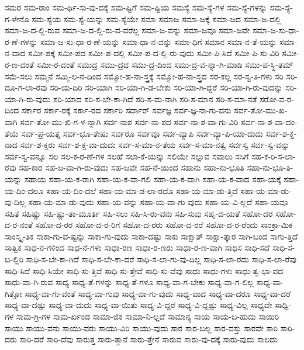 {ಸಮರ
ಸಮ-ರಾಂ
ಸಮ-ರ್ಥಿ-ಸು-ವು-ದಕ್ಕೆ
ಸಮ-ಷ್ಟಿಗೆ
ಸಮ-ಷ್ಟಿಯ
ಸಮಸ್ಯೆ
ಸಮ-ಸ್ಯೆ-ಗಳ
ಸಮ-ಸ್ಯೆ-ಗಳನ್ನು
ಸಮ-ಸ್ಯೆ-ಗ-ಳೇನೊ
ಸಮ-ಸ್ಯೆಯ
ಸಮ-ಸ್ಯೆ-ಯನ್ನು
ಸಮ-ಸ್ಯೆಯೇ
ಸಮಾ
ಸಮಾಜ
ಸಮಾ-ಜಕ್ಕೆ
ಸಮಾ-ಜದ
ಸಮಾ-ಜ-ದಲ್ಲಿ
ಸಮಾ-ಜ-ದ-ಲ್ಲಿ-ರುವ
ಸಮಾ-ಜ-ದ-ಲ್ಲಿ-ರು-ವ-ವರೆಲ್ಲ
ಸಮಾ-ಜ-ವನ್ನು
ಸಮಾ-ಜವೂ
ಸಮಾ-ಜವೇ
ಸಮಾ-ಜ-ಸು-ಧಾ-ರ-ಣೆ-ಗಳನ್ನು
ಸಮಾ-ಜ-ಸು-ಧಾ-ರ-ಣೆ-ಯನ್ನು
ಸಮಾ-ಧಾ-ನ-ವನ್ನು
ಸಮಾ-ಧಿಗೆ
ಸಮಾನ
ಸಮಾ-ನ-ತೆ-ಯನ್ನು
ಸಮಾ-ನ-ವಾದ
ಸಮೀ-ಪಕ್ಕೆ
ಸಮೀ-ಪದ
ಸಮೀ-ಪ-ದಲ್ಲಿ
ಸಮೀ-ಪ-ದ-ಲ್ಲಿ-ರು-ವುದು
ಸಮೀ-ಪಿ-ಸಿದೆ
ಸಮೀ-ಪಿ-ಸು-ವಿರಿ
ಸಮೀ-ರ-ಣ-ದಂತೆ
ಸಮೀ-ರ-ದಂತೆ
ಸಮುದ್ರ
ಸಮು-ದ್ರದ
ಸಮು-ದ್ರ-ದಿಂದ
ಸಮು-ದ್ರ-ವ-ನ್ನಾ-ಗಿ-ಮಾಡಿ
ಸಮು-ಪ-ಸ್ಥಿ-ತಮ್
ಸಮೆ-ಸಲು
ಸಮ್ಮನೆ
ಸಮ್ಮಿ-ಲ-ನ-ದಿಂದ
ಸಮ್ಮೋ-ಹ-ನಾ-ಸ್ತ್ರಕ್ಕೆ
ಸಮ್ಮೋ-ಹ-ನಾ-ಸ್ತ್ರದ
ಸರ-ಕಲ್ಲ
ಸರ-ಸ್ವ-ತಿ-ಗಳು
ಸರಿ
ಸರಿ-ದೂ-ಗ-ಲಾ-ರವು
ಸರಿ-ಯ-ದಿರಿ
ಸರಿ-ಯಾಗಿ
ಸರಿ-ಯಾ-ಗಿ-ಡ-ಬೇಕು
ಸರಿ-ಯಾ-ಗಿ-ದ್ದರೆ
ಸರಿ-ಯಾ-ಗಿ-ರು-ವುದನ್ನು
ಸರಿ-ಯಾ-ಗಿ-ರು-ವುದು
ಸರಿ-ಯಾದ
ಸರಿ-ಸ-ಬೇ-ಕಾ-ಗಿದೆ
ಸರಿ-ಸ-ಮ-ನಾಗಿ
ಸರಿ-ಸ-ಮಾನ
ಸರಿ-ಸ-ಮಾ-ನತೆ
ಸರೋ-ವ-ರ-ದಿಂದ
ಸರ್ಕಾರ
ಸರ್ಕಾ-ರಕ್ಕೆ
ಸರ್ಕಾ-ರದ
ಸರ್ಕಾರಿ
ಸರ್ದಾರ್
ಸರ್ವಜ್ಞ
ಸರ್ವ-ಜ್ಞ-ನಾ-ಗು-ವನು
ಸರ್ವ-ತೋ-ಮು-ಖ-ವಾಗಿ
ಸರ್ವ-ತೋ-ಮು-ಖಿ-ಗ-ಳ-ನ್ನಾಗಿ
ಸರ್ವ-ನಾಶ
ಸರ್ವ-ನಾ-ಶದ
ಸರ್ವ-ನಾ-ಶ-ವಾ-ಗು-ವಿರಿ
ಸರ್ವ-ನಾ-ಶ-ವಾ-ದಂ-ತೆಯೆ
ಸರ್ವ-ಪ್ರ-ಯತ್ನ
ಸರ್ವ-ಭೂ-ತೇಷು
ಸರ್ವರೂ
ಸರ್ವವೂ
ಸರ್ವ-ವ್ಯಾಪಿ
ಸರ್ವ-ವ್ಯಾ-ಪಿ-ಯಾ-ದುದು
ಸರ್ವ-ಶ-ಕ್ತ-ನಾದ
ಸರ್ವ-ಶ-ಕ್ತರು
ಸರ್ವ-ಶ-ಕ್ತ-ವಾ-ದುದು
ಸರ್ವ-ಸ-ಮಾ-ನ-ತೆಯ
ಸರ್ವ-ಸ-ಮಾ-ನತ್ವ
ಸರ್ವಸ್ವ
ಸರ್ವ-ಸ್ವ-ವನ್ನು
ಸರ್ವ-ಸ್ವ-ವನ್ನೂ
ಸಲ
ಸಲ-ಕ-ರ-ಣೆ-ಗಳ
ಸಲಹೆ
ಸಲಾ-ಕೆ-ಯನ್ನು
ಸಲಿಯೇ
ಸಲ್ಲುವ
ಸವಾಲು
ಸಸಿಗೆ
ಸಹ-ಕ-ರಿ-ಸ-ಲಾ-ರೆವು
ಸಹ-ಕಾರ
ಸಹ-ಜ-ವಾ-ಗಿ-ರು-ವುದು
ಸಹ-ಜವೇ
ಸಹ-ನೆ-ಯಿಂದ
ಸಹಾನು
ಸಹಾ-ನು-ಭೂತಿ
ಸಹಾ-ನು-ಭೂ-ತಿ-ಯನ್ನು
ಸಹಾಯ
ಸಹಾ-ಯ-ಕ-ರಾಗಿ
ಸಹಾ-ಯ-ಕ-ವಾ-ಗಲಿ
ಸಹಾ-ಯ-ಕ-ವಾಗಿ
ಸಹಾ-ಯ-ಕ-ವಾದ
ಸಹಾ-ಯಕ್ಕೆ
ಸಹಾ-ಯ-ದಿಂ-ದಲೂ
ಸಹಾ-ಯ-ದಿಂ-ದಲೆ
ಸಹಾ-ಯ-ಮಾ-ಡ-ಲಾ-ರದೊ
ಸಹಾ-ಯ-ಮಾ-ಡು-ತ್ತಿದೆ
ಸಹಾ-ಯ-ಮಾ-ಡು-ವು-ದಿಲ್ಲ
ಸಹಾ-ಯ-ಮಾ-ಡು-ವುದು
ಸಹಾ-ಯ-ವನ್ನು
ಸಹಾ-ಯ-ವಾ-ಗು-ವುದು
ಸಹಾ-ಯ-ವಿ-ಲ್ಲದೆ
ಸಹಾ-ಯವೂ
ಸಹಿತ
ಸಹಿಷ್ಣು
ಸಹಿ-ಷ್ಣು-ತಾ-ಮೂರ್ತಿ
ಸಹಿ-ಸಲು
ಸಹಿ-ಸಿ-ರು-ವನು
ಸಹಿ-ಸುವು
ಸಹೃ-ದ-ಯತೆ
ಸಹೋ-ದರ
ಸಹೋ-ದ-ರ-ನಂತೆ
ಸಹೋ-ದ-ರರ
ಸಹೋ-ದ-ರ-ರಿಗೆ
ಸಹೋ-ದ-ರರು
ಸಹೋ-ದ-ರರೆ
ಸಹೋ-ದ-ರ-ರೆಂದು
ಸಾಂಕ್ರಾ-ಮಿಕ
ಸಾಂಸ್ಕೃ-ತಿಕ
ಸಾಕಾ-ಗು-ವ-ಷ್ಟನ್ನು
ಸಾಕಾ-ಗು-ವುದು
ಸಾಕಾ-ದಷ್ಟು
ಸಾಕು
ಸಾಕ್ಷಾತ್
ಸಾಕ್ಷಾ-ತ್ಕಾರ
ಸಾಗಿ-ಬಂದ
ಸಾಗು-ತ್ತಿದೆ
ಸಾತ್ವಿಕ
ಸಾಧ-ನ-ಗಳಿಂದ
ಸಾಧ-ನೆ-ಗಳು
ಸಾಧಾ-ರಣ
ಸಾಧಾ-ರ-ಣರು
ಸಾಧಾ-ರ-ಣ-ವಾಗಿ
ಸಾಧಿಸ
ಸಾಧಿ-ಸದೆ
ಸಾಧಿ-ಸ-ಬ-ಲ್ಲಿರಿ
ಸಾಧಿ-ಸ-ಬೇ-ಕಾ-ಗಿದೆ
ಸಾಧಿ-ಸ-ಬೇ-ಕಾ-ದರೆ
ಸಾಧಿ-ಸ-ಲಾ-ಗು-ವು-ದಿಲ್ಲ
ಸಾಧಿ-ಸ-ಲಾ-ರದು
ಸಾಧಿ-ಸ-ಲಾ-ರೆವು
ಸಾಧಿ-ಸಿದೆ
ಸಾಧಿ-ಸಿಯೇ
ಸಾಧಿ-ಸು-ತ್ತಿವೆ
ಸಾಧಿ-ಸು-ತ್ತೇವೆ
ಸಾಧಿ-ಸು-ವೆವು
ಸಾಧು
ಸಾಧು-ಗಳು
ಸಾಧು-ತ್ವ-ಭಾ-ವದ
ಸಾಧು-ವಾ-ಗಿ-ರುವ
ಸಾಧ್ಯ
ಸಾಧ್ಯ-ತೆ-ಗಳನ್ನು
ಸಾಧ್ಯ-ತೆ-ಗಳೂ
ಸಾಧ್ಯ-ವಾ-ಗ-ಬೇಕು
ಸಾಧ್ಯ-ವಾ-ಗ-ಲಿಲ್ಲ
ಸಾಧ್ಯ-ವಾ-ಗಿತ್ತೋ
ಸಾಧ್ಯ-ವಾ-ಗು-ವಂತೆ
ಸಾಧ್ಯ-ವಾ-ಗುವು
ಸಾಧ್ಯ-ವಾ-ಗು-ವುದು
ಸಾಧ್ಯ-ವಾದ
ಸಾಧ್ಯ-ವಾ-ದರೂ
ಸಾಧ್ಯ-ವಾ-ದರೆ
ಸಾಧ್ಯ-ವಾ-ದಷ್ಟು
ಸಾಧ್ಯ-ವಾ-ದುದು
ಸಾಧ್ಯ-ವಾ-ಯಿತು
ಸಾಧ್ಯ-ವಿ-ದ್ದರೆ
ಸಾಧ್ಯ-ವಿ-ದ್ದಷ್ಟು
ಸಾಧ್ಯ-ವಿಲ್ಲ
ಸಾಧ್ಯವೇ
ಸಾಧ್ವಿ-ಗಳ
ಸಾಮ-ಗ್ರಿ-ಗಳ
ಸಾಮ-ರ್ಖಂಡ
ಸಾಮಾ-ಜಿಕ
ಸಾಮಾ-ನಿ-ಲ್ಲದೆ
ಸಾಮಾನ್ಯ
ಸಾಯ
ಸಾಯ-ಬ-ಹುದು
ಸಾಯಿರಿ
ಸಾಯು
ಸಾಯು-ವನು
ಸಾಯು-ವರು
ಸಾಯು-ವಿರಿ
ಸಾಯು-ವುದು
ಸಾರ
ಸಾರ-ಬಲ್ಲ
ಸಾರ-ವಸ್ತು
ಸಾರವೇ
ಸಾರಿ
ಸಾರಿ-ದರು
ಸಾರಿ-ದರೆ
ಸಾರಿ-ದೆವು
ಸಾರುತ್ತ
ಸಾರು-ತ್ತಾನೆ
ಸಾರು-ತ್ತೇನೆ
ಸಾರುವ
ಸಾರು-ವು-ದಕ್ಕೆ
ಸಾರು-ವುದು
ಸಾಲದು
}
